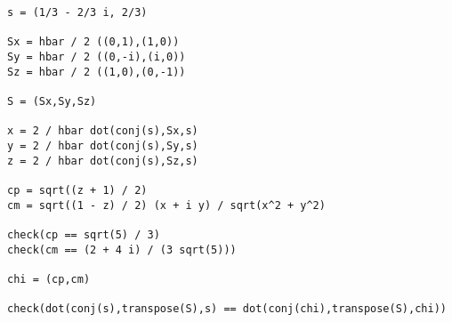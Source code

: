 
{\footnotesize\begin{verbatim}
s = (1/3 - 2/3 i, 2/3)

Sx = hbar / 2 ((0,1),(1,0))
Sy = hbar / 2 ((0,-i),(i,0))
Sz = hbar / 2 ((1,0),(0,-1))

S = (Sx,Sy,Sz)

x = 2 / hbar dot(conj(s),Sx,s)
y = 2 / hbar dot(conj(s),Sy,s)
z = 2 / hbar dot(conj(s),Sz,s)

cp = sqrt((z + 1) / 2)
cm = sqrt((1 - z) / 2) (x + i y) / sqrt(x^2 + y^2)

check(cp == sqrt(5) / 3)
check(cm == (2 + 4 i) / (3 sqrt(5)))

chi = (cp,cm)

check(dot(conj(s),transpose(S),s) == dot(conj(chi),transpose(S),chi))
\end{verbatim}}

